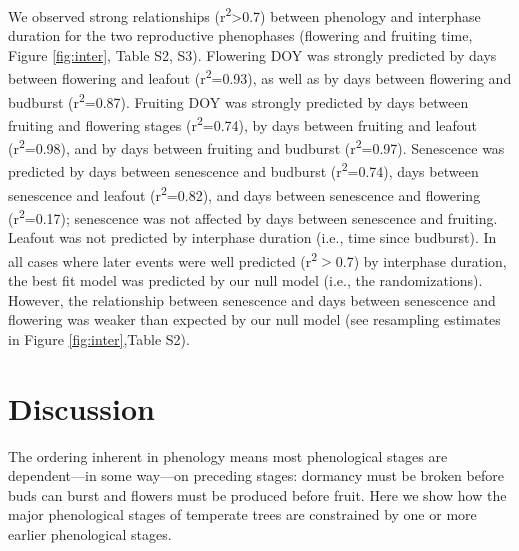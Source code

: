 \documentclass{article}
\begin{document}
\par We observed strong relationships (r\textsuperscript{2}>0.7) between phenology and interphase duration for the two reproductive phenophases (flowering and fruiting time, Figure \ref{fig:inter}, Table S2, S3). Flowering DOY was strongly predicted by days between flowering and leafout (r\textsuperscript{2}=0.93), as well as by days between flowering and budburst (r\textsuperscript{2}=0.87). Fruiting DOY was strongly predicted by days between fruiting and flowering stages (r\textsuperscript{2}=0.74), by days between fruiting and leafout (r\textsuperscript{2}=0.98), and by days between fruiting and budburst (r\textsuperscript{2}=0.97). Senescence was predicted by days between senescence and budburst (r\textsuperscript{2}=0.74), days between senescence and leafout (r\textsuperscript{2}=0.82), and days between senescence and flowering (r\textsuperscript{2}=0.17); senescence was not affected by days between senescence and fruiting. Leafout was not predicted by interphase duration (i.e., time since budburst). In all cases where later events were well predicted (r\textsuperscript{2}$>$0.7) by interphase duration, the best fit model was predicted by our null model (i.e., the randomizations). However, the relationship between senescence and days between senescence and flowering was weaker than expected by our null model (see resampling estimates in Figure \ref{fig:inter},Table S2).

\section* {Discussion}
\par The ordering inherent in phenology means most phenological stages are dependent---in some way---on preceding stages: dormancy must be broken before buds can burst and flowers must be produced before fruit. Here we show how the major phenological stages of temperate trees are constrained by one or more earlier phenological stages. 
\end{document}

